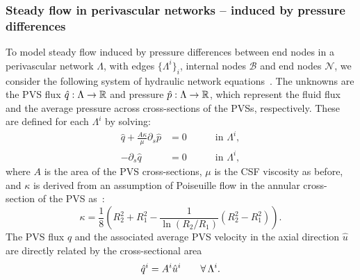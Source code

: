 
\subsubsection{Steady flow in perivascular networks -- induced by pressure differences}

To model steady flow induced by pressure differences between end nodes
in a perivascular network $\Lambda$, with edges $\{\Lambda^i\}_i$,
internal nodes $\mathcal{B}$ and end nodes $\mathcal{N}$, we consider
the following system of hydraulic network
equations~\cite{tithof2022network, daversin2022geometrically,
  gjerde2024directional}. The unknowns are the PVS flux $\hat{q} :
\Lambda \rightarrow \mathbb{R}$ and pressure $\hat{p} : \Lambda
\rightarrow \mathbb{R}$, which represent the fluid flux and the average
pressure across cross-sections of the PVSs, respectively. These are
defined for each $\Lambda^i$ by solving:
\begin{subequations}
\begin{alignat}{2}
  \hat{q} + \frac{A \kappa}{\mu} \partial_{s} \hat{p} & = 0 &&
  \quad \text{ in } \Lambda^i , \\ 
  - \partial_s \hat{q} & = 0 &&
  \quad \text{ in } \Lambda^i ,  
\end{alignat} 
\label{eq:1d_flow}%
\end{subequations}%
where $A$ is the area of the PVS cross-sections, $\mu$ is the CSF viscosity as before, and $\kappa$ is derived from an assumption of Poiseuille flow in the annular cross-section of the PVS as~\cite{tithof2022network}: 
\begin{equation}
\kappa = \frac18 \left( R_2^2 + R_1^2 - \frac{1}{\ln(R_2/R_1)} (R_2^2- R_1^2) \right). 
\end{equation}
The PVS flux $\hat{q}$ and the associated average PVS velocity in the
axial direction $\hat{u}$ are directly related by the cross-sectional area
\begin{equation}
  \hat{q}^i = A^i \hat{u}^i \qquad \forall \, \Lambda^i.
\end{equation}

